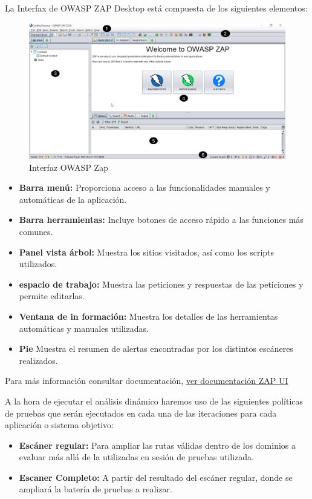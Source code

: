 La Interfax de OWASP ZAP Desktop está compuesta de los siguientes elementos:
\begin{figure}[h!] 
    \captionsetup{width=1\linewidth}   
    \includegraphics[width=\linewidth]{./imagenes/03_OWASPZAP_Interfaz.png}
    \caption{Interfaz OWASP Zap}  
\end{figure}

\begin{itemize}
    \item \textbf{Barra menú:} Proporciona acceso a las funcionalidades manuales y automáticas de la aplicación.
    \item \textbf{Barra herramientas:} Incluye botones de acceso rápido a las funciones más comunes.
    \item \textbf{Panel vista árbol:} Muestra los sitios visitados, así como los scripts utilizados.
    \item \textbf{espacio de trabajo:} Muestra las peticiones y respuestas de las peticiones y permite editarlas.
    \item \textbf{Ventana de in formación:} Muestra los detalles de las herramientas automáticas y manuales utilizadas. 
    \item \textbf{Pie} Muestra el resumen de alertas encontradas por los distintos escáneres realizados.
\end{itemize}

Para más información consultar documentación, \href{https://www.zaproxy.org/docs/desktop/ui/}{ver documentación ZAP UI}

A la hora de ejecutar el análisis dinámico haremos uso de las siguientes políticas de pruebas 
que serán ejecutados en cada una de las iteraciones para cada aplicación o sistema objetivo:

\begin{itemize}
    \item \textbf{Escáner regular:} Para ampliar las rutas válidas dentro de los dominios a evaluar más allá de la utilizadas en sesión de pruebas utilizada.
    \item \textbf{Escaner Completo:} A partir del resultado del escáner regular, donde se ampliará la batería de pruebas a realizar.
\end{itemize}
